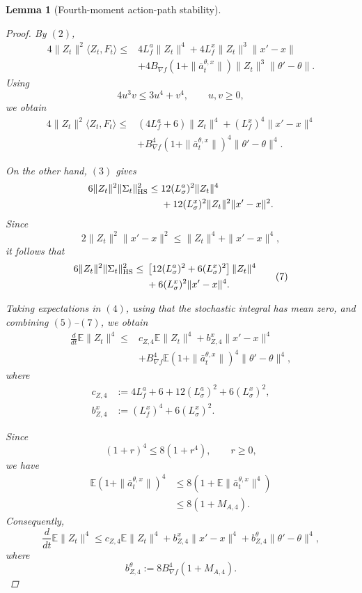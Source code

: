 \documentclass{article}
\newtheorem{lem}[thm]{Lemma}
\theoremstyle{definition}
\theoremstyle{remark}
\theoremstyle{mystyle}
\newcommand{\1}{\mathbbm{1}}
\begin{document}
\begin{lem}[Fourth-moment action-path stability]
\begin{proof}
By \((2)\),
\[
\begin{aligned}
4\|Z_t\|^2\langle Z_t,F_t\rangle
\le{}&
4L_f^a\|Z_t\|^4
+
4L_f^x\|Z_t\|^3\|x'-x\|\\
&+
4B_{\nabla f}
\left(1+\|\bar a_t^{\theta,x}\|\right)
\|Z_t\|^3\|\theta'-\theta\|.
\end{aligned}
\]
Using
\[
4u^3v\le 3u^4+v^4,
\qquad u,v\ge0,
\]
we obtain
\[
\begin{aligned}
4\|Z_t\|^2\langle Z_t,F_t\rangle
\le{}&
(4L_f^a+6)\|Z_t\|^4
+
(L_f^x)^4\|x'-x\|^4\\
&+
B_{\nabla f}^4
\left(1+\|\bar a_t^{\theta,x}\|\right)^4
\|\theta'-\theta\|^4.
\end{aligned}
\tag{6}
\]

On the other hand, \((3)\) gives
\[
\begin{aligned}
6\|Z_t\|^2\|\Sigma_t\|_{\rm HS}^2
\le{}&
12(L_\sigma^a)^2\|Z_t\|^4\\
&+
12(L_\sigma^x)^2
\|Z_t\|^2\|x'-x\|^2.
\end{aligned}
\]
Since
\[
2\|Z_t\|^2\|x'-x\|^2
\le
\|Z_t\|^4+\|x'-x\|^4,
\]
it follows that
\[
\begin{aligned}
6\|Z_t\|^2\|\Sigma_t\|_{\rm HS}^2
\le{}&
\left[
12(L_\sigma^a)^2
+
6(L_\sigma^x)^2
\right]\|Z_t\|^4\\
&+
6(L_\sigma^x)^2\|x'-x\|^4.
\end{aligned}
\tag{7}
\]

Taking expectations in \((4)\), using that the stochastic integral has
mean zero, and combining \((5)\)--\((7)\), we obtain
\[
\begin{aligned}
\frac{d}{dt}\mathbb E\|Z_t\|^4
\le{}&
c_{Z,4}\mathbb E\|Z_t\|^4
+
b_{Z,4}^x\|x'-x\|^4\\
&+
B_{\nabla f}^4
\mathbb E
\left(1+\|\bar a_t^{\theta,x}\|\right)^4
\|\theta'-\theta\|^4,
\end{aligned}
\tag{8}
\]
where
\[
\begin{aligned}
c_{Z,4}
&:=
4L_f^a+6
+12(L_\sigma^a)^2
+6(L_\sigma^x)^2,\\
b_{Z,4}^x
&:=
(L_f^x)^4+6(L_\sigma^x)^2.
\end{aligned}
\tag{9}
\]

Since
\[
(1+r)^4\le 8(1+r^4),
\qquad r\ge0,
\]
we have
\[
\begin{aligned}
\mathbb E
\left(1+\|\bar a_t^{\theta,x}\|\right)^4
&\le
8\left(
1+\mathbb E\|\bar a_t^{\theta,x}\|^4
\right)\\
&\le
8(1+M_{A,4}).
\end{aligned}
\]
Consequently,
\[
\frac{d}{dt}\mathbb E\|Z_t\|^4
\le
c_{Z,4}\mathbb E\|Z_t\|^4
+
b_{Z,4}^x\|x'-x\|^4
+
b_{Z,4}^\theta\|\theta'-\theta\|^4,
\tag{10}
\]
where
\[
b_{Z,4}^\theta
:=
8B_{\nabla f}^4(1+M_{A,4}).
\tag{11}
\]


\end{proof}
\end{lem}
\end{document}
